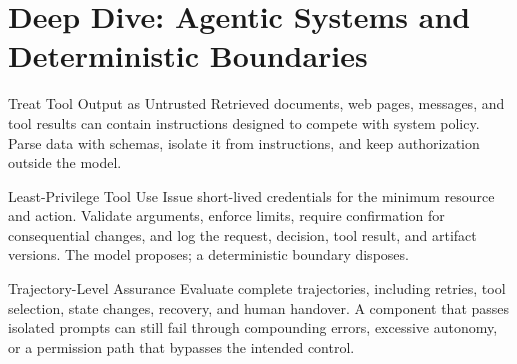 %
\section{Deep Dive: Agentic Systems and Deterministic Boundaries}
\begin{v3topic}{Treat Tool Output as Untrusted}
Retrieved documents, web pages, messages, and tool results can contain
instructions designed to compete with system policy.
Parse data with schemas, isolate it from instructions, and keep authorization
outside the model.

\end{v3topic}
\begin{v3topic}{Least-Privilege Tool Use}
Issue short-lived credentials for the minimum resource and action.
Validate arguments, enforce limits, require confirmation for consequential
changes, and log the request, decision, tool result, and artifact versions.
The model proposes; a deterministic boundary disposes.

\end{v3topic}
\begin{v3topic}{Trajectory-Level Assurance}
Evaluate complete trajectories, including retries, tool selection, state
changes, recovery, and human handover.
A component that passes isolated prompts can still fail through compounding
errors, excessive autonomy, or a permission path that bypasses the intended
control.
\end{v3topic}

